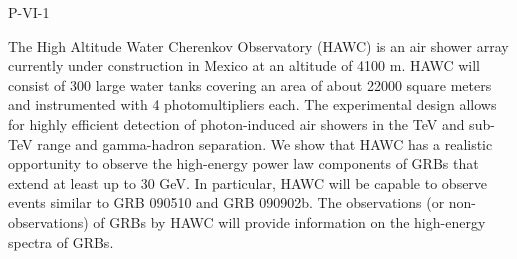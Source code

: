 P-VI-1


\bigskip



\bigskip

\noindent The High Altitude Water Cherenkov Observatory (HAWC) is an air shower array currently under construction in Mexico at an altitude of 4100 m. HAWC will consist of 300 large water tanks covering an area of about 22000 square meters and instrumented with 4 photomultipliers each. The experimental design allows for highly efficient detection of photon-induced air showers in the TeV and sub-TeV range and gamma-hadron separation. We show that HAWC has a realistic opportunity to observe the high-energy power law components of GRBs that extend at least up to 30 GeV. In particular, HAWC will be capable to observe events similar to GRB 090510 and GRB 090902b. The observations (or non-observations) of GRBs by HAWC will provide information on the high-energy spectra of GRBs.
